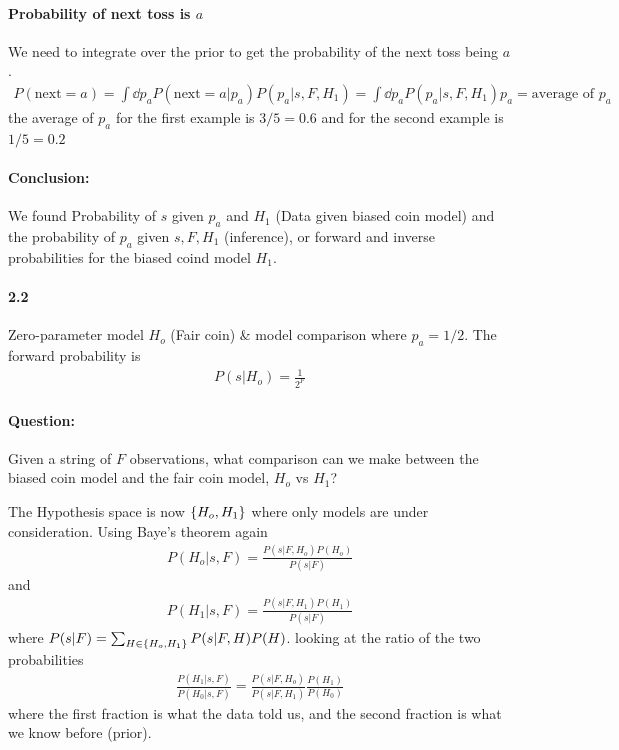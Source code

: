 \documentclass[../main.tex]{subfiles}
\begin{document}
\paragraph{Probability of next toss is $a$} We need to integrate over the prior to get the
probability of the next toss being $a$.
\begin{align*}
    P(\textrm{next} = a) = \int \dd{p_a} P(\textrm{next} = a | p_a) P(p_a|s, F, H_1)
    = \int \dd{p_a} P(p_a|s, F, H_1) p_a = \textrm{average of } p_a
\end{align*}
the average of $p_a$ for the first example is $3/5 = 0.6$ and for the second example is $1/5 = 0.2$

\paragraph{Conclusion:} We found Probability of $s$ given $p_a$ and $H_1$ (Data given biased coin
model) and the probability of $p_a$ given $s, F, H_1$ (inference), or forward and inverse
probabilities for the biased coind model $H_1$. 

\paragraph{2.2} Zero-parameter model $H_o$ (Fair coin) \& model comparison where $p_a = 1/2$. The
forward probability is
\begin{align*}
    P(s|H_o) = \frac{1}{2^F}
\end{align*}

\paragraph{Question:} Given a string of $F$ observations, what comparison can we make between the
biased coin model and the fair coin model, $H_o$ vs $H_1$?

The Hypothesis space is now $\qt{H_o, H_1}$ where only models are under consideration. Using Baye's
theorem again
\begin{align*}
    P(H_o|s, F) = \frac{P(s|F, H_o) P(H_o)}{P(s | F)}
\end{align*}
and 
\begin{align*}
    P(H_1|s, F) = \frac{P(s|F, H_1) P(H_1)}{P(s | F)}
\end{align*}
where $P(s|F) = \sum_{H \in \qt{H_o, H_1}} P(s|F, H) P(H)$. looking at the ratio of the two
probabilities
\begin{align*}
    \frac{P(H_1|s, F)}{P(H_0|s, F)} = \frac{P(s|F, H_o)}{P(s|F, H_1)} \frac{P(H_1)}{P(H_0)}
\end{align*}
where the first fraction is what the data told us, and the second fraction is what we know before
(prior).
\end{document}
